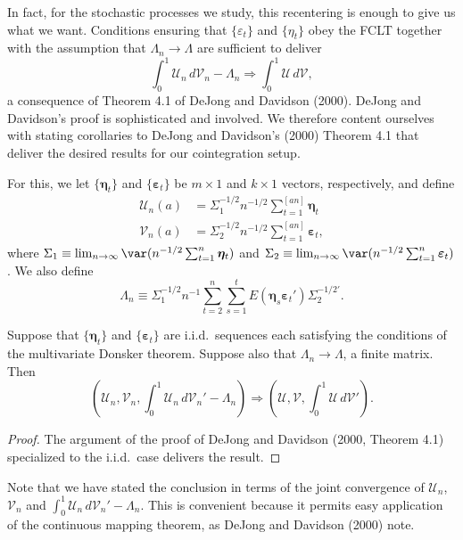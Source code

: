 In fact, for the stochastic processes we study, this recentering is enough to give us what we want. Conditions ensuring that $\{\varepsilon_t\}$ and $\{\eta_t\}$ obey the FCLT together with the assumption that $\Lambda_n \to \Lambda$ are sufficient to deliver
\[
\int_0^1 \mathcal{U}_n\,d\mathcal{V}_n - \Lambda_n \Rightarrow \int_0^1 \mathcal{U}\,d\mathcal{V},
\]
a consequence of Theorem 4.1 of DeJong and Davidson (2000). DeJong and Davidson's proof is sophisticated and involved. We therefore content ourselves with stating corollaries to DeJong and Davidson's (2000) Theorem 4.1 that deliver the desired results for our cointegration setup.

For this, we let $\{\boldsymbol{\eta}_t\}$ and $\{\boldsymbol{\varepsilon}_t\}$ be $m \times 1$ and $k \times 1$ vectors, respectively, and define
\begin{align*}
\boldsymbol{\mathcal{U}}_n(a) &= \Sigma_1^{-1/2}n^{-1/2}\sum_{t=1}^{[an]} \boldsymbol{\eta}_t \\
\boldsymbol{\mathcal{V}}_n(a) &= \Sigma_2^{-1/2}n^{-1/2}\sum_{t=1}^{[an]} \boldsymbol{\varepsilon}_t,
\end{align*}
where $\Sigma_1 \equiv \lim_{n\to\infty} \var(n^{-1/2}\sum_{t=1}^{n} \boldsymbol{\eta}_t)$ and $\Sigma_2 \equiv \lim_{n\to\infty} \var(n^{-1/2}\sum_{t=1}^{n} \boldsymbol{\varepsilon}_t)$. We also define
\[
\Lambda_n \equiv \Sigma_1^{-1/2}n^{-1}\sum_{t=2}^{n}\sum_{s=1}^{t} E(\boldsymbol{\eta}_s \boldsymbol{\varepsilon}_t')\Sigma_2^{-1/2\prime}.
\]

\begin{theorem}\label{thm:iid-stoch-int}
Suppose that $\{\boldsymbol{\eta}_t\}$ and $\{\boldsymbol{\varepsilon}_t\}$ are i.i.d.\ sequences each satisfying the conditions of the multivariate Donsker theorem. Suppose also that $\Lambda_n \to \Lambda$, a finite matrix. Then
\[
\left(\boldsymbol{\mathcal{U}}_n, \boldsymbol{\mathcal{V}}_n, \int_0^1 \boldsymbol{\mathcal{U}}_n\,d\boldsymbol{\mathcal{V}}_n' - \Lambda_n\right) \Rightarrow \left(\boldsymbol{\mathcal{U}}, \boldsymbol{\mathcal{V}}, \int_0^1 \boldsymbol{\mathcal{U}}\,d\boldsymbol{\mathcal{V}}'\right).
\]
\end{theorem}

\begin{proof}
The argument of the proof of DeJong and Davidson (2000, Theorem 4.1) specialized to the i.i.d.\ case delivers the result.
\end{proof}

Note that we have stated the conclusion in terms of the joint convergence of $\boldsymbol{\mathcal{U}}_n$, $\boldsymbol{\mathcal{V}}_n$ and $\int_0^1 \boldsymbol{\mathcal{U}}_n\,d\boldsymbol{\mathcal{V}}_n' - \Lambda_n$. This is convenient because it permits easy application of the continuous mapping theorem, as DeJong and Davidson (2000) note.

